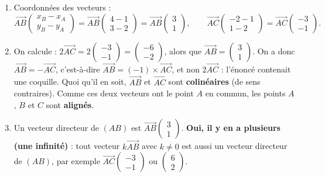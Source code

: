 \documentclass[11pt]{article}
\begin{document}
\begin{corrige}
\begin{enumerate}
\item Coordonnées des vecteurs :
\[ \overrightarrow{AB}\begin{pmatrix} x_B - x_A \\ y_B - y_A \end{pmatrix} = \overrightarrow{AB}\begin{pmatrix} 4-1 \\ 3-2 \end{pmatrix} = \overrightarrow{AB}\begin{pmatrix} 3 \\ 1 \end{pmatrix}, \qquad
\overrightarrow{AC}\begin{pmatrix} -2-1 \\ 1-2 \end{pmatrix} = \overrightarrow{AC}\begin{pmatrix} -3 \\ -1 \end{pmatrix}. \]
\item On calcule : $2\overrightarrow{AC} = 2\begin{pmatrix} -3 \\ -1 \end{pmatrix} = \begin{pmatrix} -6 \\ -2 \end{pmatrix}$, alors que $\overrightarrow{AB} = \begin{pmatrix} 3 \\ 1 \end{pmatrix}$. On a donc $\overrightarrow{AB} = -\overrightarrow{AC}$, c'est-à-dire $\overrightarrow{AB} = (-1)\times\overrightarrow{AC}$, et non $2\overrightarrow{AC}$ : l'énoncé contenait une coquille. Quoi qu'il en soit, $\overrightarrow{AB}$ et $\overrightarrow{AC}$ sont \textbf{colinéaires} (de sens contraires). Comme ces deux vecteurs ont le point $A$ en commun, les points $A$, $B$ et $C$ sont \textbf{alignés}.
\item Un vecteur directeur de $(AB)$ est $\overrightarrow{AB}\begin{pmatrix} 3 \\ 1 \end{pmatrix}$. \textbf{Oui, il y en a plusieurs (une infinité)} : tout vecteur $k\overrightarrow{AB}$ avec $k \neq 0$ est aussi un vecteur directeur de $(AB)$, par exemple $\overrightarrow{AC}\begin{pmatrix} -3 \\ -1 \end{pmatrix}$ ou $\begin{pmatrix} 6 \\ 2 \end{pmatrix}$.
\end{enumerate}
\end{corrige}
\end{document}
